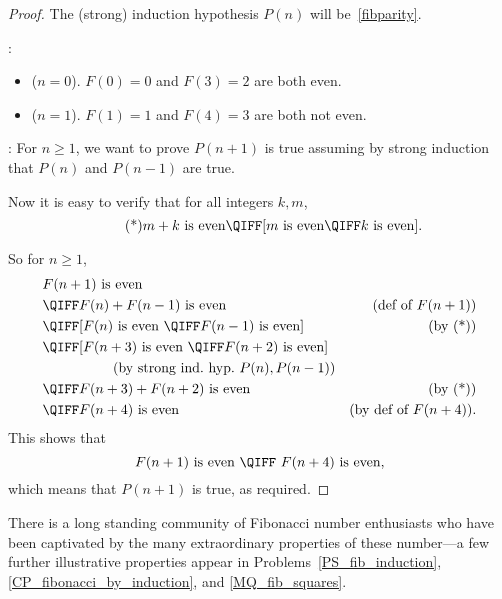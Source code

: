 \begin{proof}
The (strong) induction hypothesis $P(n)$ will be~\eqref{fibparity}.

:
\begin{itemize}

\item ($n=0$).  $F(0) = 0$ and $F(3) = 2$ are both even.

\item ($n=1$).  $F(1) = 1$ and $F(4) = 3$ are both not even.

\end{itemize}

: For $n \geq 1$, we want to prove
$P(n+1)$ is true assuming by strong induction that $P(n)$ and $P(n-1)$
are true.

Now it is easy to verify that for all integers $k,m$,
\begin{equation}\tag{*}
m + k\ \text{is even} \QIFF [m\ \text{is even} \QIFF k\ \text{is even}].
\end{equation}

So for $n \geq 1$,
\begin{align*}
\lefteqn{F(n+1)\ \text{is even}}\\
& \QIFF F(n) + F(n-1)\ \text{is even}
        & \text{(def of $F(n+1)$)}\\
& \QIFF [F(n)\ \text{is even}\ \QIFF  F(n-1)\ \text{is even}]
        & \text{(by~(*))}\\
& \QIFF [F(n+3)\ \text{is even}\ \QIFF  F(n+2)\ \text{is even}]\\
&      \hspace{0.7in} \text{(by strong ind.\ hyp.\ $P(n), P(n-1)$)}\\
& \QIFF F(n+3) + F(n+2)\ \text{is even}
        & \text{(by~(*))}\\
& \QIFF F(n+4)\ \text{is even}
         & \text{(by def of $F(n+4)$)}.
\end{align*}
This shows that
\[
F(n+1)\ \text{is even}\ \QIFF\  F(n+4)\ \text{is even},
\]
which means that $P(n+1)$ is true, as required.
\end{proof}

There is a long standing community of Fibonacci number enthusiasts who
have been captivated by the many extraordinary properties of these
number---a few further illustrative properties appear in
Problems~\ref{PS_fib_induction}, \ref{CP_fibonacci_by_induction}, and
\ref{MQ_fib_squares}.

